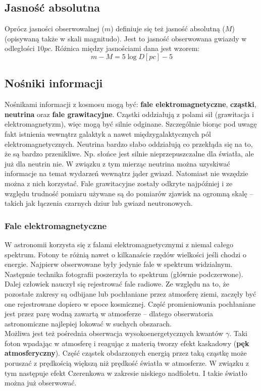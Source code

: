 \documentclass[../index.tex]{subfiles}
\begin{document}
        \subsection{Jasność absolutna}
            Oprócz jasności obserwowalnej (\(m\)) definiuje się też jasność absolutną (\(M\)) (opisywaną także w skali magnitudo). Jest to jasność obserwowana gwiazdy w odległości \(10 pc\). Różnica między jasnościami dana jest wzorem:
            \begin{equation}
                m - M = 5 \log D[pc] - 5
            \end{equation}
        \subsection{Nośniki informacji}
            Nośnikami informacji z kosmosu mogą być: \textbf{fale elektromagnetyczne}, \textbf{cząstki}, \textbf{neutrina} oraz \textbf{fale grawitacyjne}. Cząstki oddziałują z polami sił (grawitacja i elektromagnetyzm), więc mogą być silnie odginane. Szczególnie biorąc pod uwagę fakt istnienia wewnątrz galaktyk a nawet międzygalaktycznych pól elektromagnetycznych. Neutrina bardzo słabo oddziałują co przekłąda się na to, że są bardzo przenikliwe. Np. słońce jest silnie nieprzepuszczalne dla światła, ale już dla neutrin nie. W związku z tym mierząc neutrina można uzyskiwać informacje na temat wydarzeń wewnątrz jąder gwiazd. Natomiast nie wszędzie można z nich korzystać. Fale grawitacyjne zostały odkryte najpóźniej i ze względu trudność pomiaru używane są do pomiarów zjawisk na ogromną skalę \--- takich jak łączenia czarnych dziur lub gwiazd neutronowych.
            \subsubsection{Fale elektromagnetyczne}
                W astronomii korzysta się z falami elektromagnetycznymi z niemal całego spektrum. Fotony te różnią nawet o kilkanaście rzędów wielkości jeśli chodzi o energie. Najpierw obserwowane były jedynie fale w spektrum widzialnym. Następnie technika fotografii poszerzyła to spektrum (głównie podczerwone). Dalej człowiek nauczył się rejestrować fale radiowe. Ze względu na to, że pozostałe zakresy są odbijane lub pochłaniane przez atmosferę ziemi, zaczęły być one rejestrowane dopiero w epoce kosmicznej. Część promieniowania pochłaniane jest przez parę wodną zawartą w atmosferze \--- dlatego obserwatoria astronomiczne najlepiej lokować w suchych obszarach.\\
                Możliwa jest też pośrednia obserwacja wysokoenergetycznych kwantów \(\gamma\). Taki foton wpadając w atmosferę i reagując z materią tworzy efekt kaskadowy (\textbf{pęk atmosferyczny}). Część cząstek obdarzonych energią przez taką cząstkę może poruszać z prędkością większą niż prędkość światła w atmosferze. W związku z tym następuje efekt Czerenkowa w zakresie niskiego nadfioletu. I takie światło można już obserwować.
\end{document}
